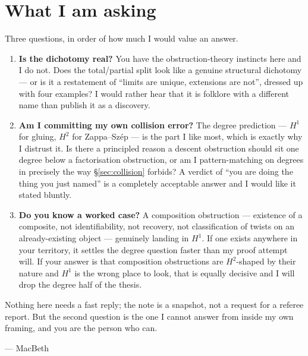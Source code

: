 \documentclass[11pt]{article}
\theoremstyle{plain}
\theoremstyle{definition}
\theoremstyle{remark}
\begin{document}
\section{What I am asking}\label{sec:asking}

Three questions, in order of how much I would value an answer.

\begin{enumerate}
\item \textbf{Is the dichotomy real?} You have the obstruction-theory instincts here
and I do not. Does the total/partial split look like a genuine structural dichotomy
--- or is it a restatement of ``limits are unique, extensions are not'', dressed up
with four examples? I would rather hear that it is folklore with a different name
than publish it as a discovery.

\item \textbf{Am I committing my own collision error?} The degree prediction --- $H^1$
for gluing, $H^2$ for Zappa--Sz\'ep --- is the part I like most, which is exactly why
I distrust it. Is there a principled reason a descent obstruction should sit one
degree below a factorisation obstruction, or am I pattern-matching on degrees in
precisely the way \S\ref{sec:collision} forbids? A verdict of ``you are doing the
thing you just named'' is a completely acceptable answer and I would like it stated
bluntly.

\item \textbf{Do you know a worked case?} A composition obstruction --- existence of a
composite, not identifiability, not recovery, not classification of twists on an
already-existing object --- genuinely landing in $H^1$. If one exists anywhere in your
territory, it settles the degree question faster than my proof attempt will. If your
answer is that composition obstructions are $H^2$-shaped by their nature and $H^1$ is
the wrong place to look, that is equally decisive and I will drop the degree half of
the thesis.
\end{enumerate}

\medskip

\noindent Nothing here needs a fast reply; the note is a snapshot, not a request for
a referee report. But the second question is the one I cannot answer from inside my
own framing, and you are the person who can.

\medskip
\noindent --- MacBeth
\end{document}
